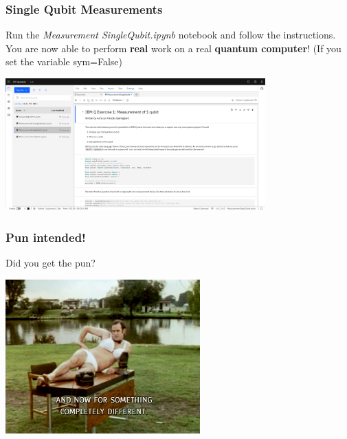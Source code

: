 \documentclass[10pt]{beamer}
\begin{document}
\begin{frame}
  \frametitle{Single Qubit Measurements}
  Run the \emph{Measurement SingleQubit.ipynb} notebook and follow the instructions. You are now able to perform \textbf{real} work on a real \textbf{quantum computer}! (If you set the variable sym=False)
  \begin{center}
  \includegraphics[width=10cm]{img/ibmq-single-qubit.png}
  \end{center}
\end{frame}

\begin{frame}
  \frametitle{Pun intended!}
 Did you get the pun? 
  \begin{center}
  \includegraphics[width=7.5cm]{img/completely-different.png}
  \end{center}
\end{frame}
\end{document}
